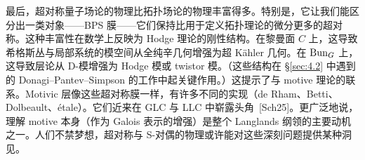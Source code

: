 最后，超对称量子场论的物理比拓扑场论的物理丰富得多。特别是，它让我们能区分出一类对象——BPS 膜——它们保持比用于定义拓扑理论的微分更多的超对称。这种丰富性在数学上反映为 Hodge 理论的刚性结构。在黎曼面 $C$ 上，这导致希格斯丛与局部系统的模空间从全纯辛几何增强为超 Kähler 几何。在 $\operatorname{Bun}_{G}$ 上，这导致层论从 D-模增强为 Hodge 模或 twistor 模。（这些结构在 \S\ref{sec:4.2} 中遇到的 Donagi–Pantev–Simpson 的工作中起关键作用。）这提示了与 motive 理论的联系。Motivic 层像这些超对称膜一样，有许多不同的实现（de Rham、Betti、Dolbeault、étale）。它们近来在 GLC 与 LLC 中崭露头角~[Sch25]。更广泛地说，理解 motive 本身（作为 Galois 表示的增强）是整个 Langlands 纲领的主要动机之一。人们不禁梦想，超对称与 S-对偶的物理或许能对这些深刻问题提供某种洞见。
